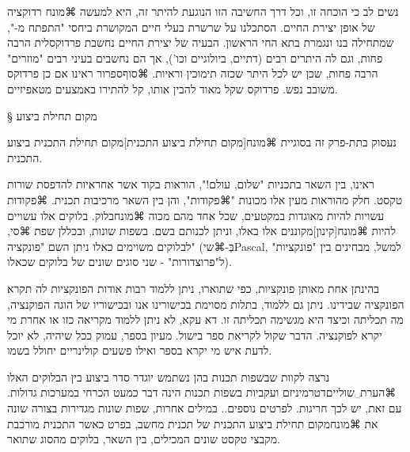 נשים לב כי הוכחה זו, וכל דרך החשיבה הזו הנוגעת להיתר זה, היא למעשה ⌘מונח {רדוקציה} של אופן יצירת החיים. הסתכלנו על שרשרת בעלי חיים המקושרת ביחסי "התפתח מ-", שמתחילה בנו ונגמרת בתא החי הראשון. הבעיה של יצירת החיים נחשבת פרדוקסלית הרבה פחות, וגם לה היתרים רבים (דתיים, ביולוגיים וכו'), אך הם נחשבים בעיני רבים "מוזרים" הרבה פחות, שכן יש לכל היתר שכזה תימוכין וראיות.
⌘סוף{ספרור}
ראינו אם כן פרדוקס משובב נפש. פרדוקס שקל מאוד להבין אותו, קל להתירו באמצעים מטאפיזיים.

§ מקום תחילת ביצוע

נעסוק בתת-פרק זה בסוגיית ⌘מונח[מקום תחילת ביצוע התכנית]{מקום תחילת התכנית} ביצוע התכנית.

ראינו, בין השאר בתכניות "שלום, עולם!", הוראות בקוד אשר אחראיות להדפסת שורות טקסט. חלק מהוראות מעין אלו מכונות "⌘פקודות", והן בין השאר מרכיבות תכנית. ⌘פקודות עשויות להיות מאוגדות במקטעים, שכל אחד מהם מכוה ⌘מונח{בלוק}. בלוקים אלו עשויים להיות ⌘מונח[קינון]{מקוננים} אלו באלו, וניתן לכנותם בשם. בשפות שונות, ובכללן שפת ⌘סי, לבלוקים משוימים כאלו ניתן השם "פונקציה" (בְּ-⌘שי{Pascal}, למשל, מבחינים בין "פונקציות" ל"פרוצדורות" - שני סוגים שונים של בלוקים שכאלו). 

בהינתן אחת מאותן פונקציות, כפי שתוארו, ניתן ללמוד רבות אודות הפונקציות לה תקרא הפונקציה שבידינו. ניתן גם ללמוד, בתלות מסוימת בכישורינו אנו ובכישוריו של הוגה הפוקנציה, מה תכליתה וכיצד היא מגשימה תכליתה זו. דא עקא, לא ניתן ללמוד מקריאה כזו או אחרת מי יקרא לפוקנציה. הדבר שקול לקריאת ספר בישול. מעיון בספר, עמוק ככל שיהיה, לא יוכל לדעת איש מי יקרא בספר ואילו פשעים קולינריים יחולל בשמו. 

נרצה לקוות שבשפות תכנות בהן נשתמש יוגדר סדר ביצוע בין הבלוקים האלו ⌘הערת␣שוליים{דטרמיניזם ועקביות בשפות תכנות הינה דבר כמעט הכרחי במערכות גדולות. עם זאת, יש לכך חריגות. לפרטים נוספים.}. במילים אחרות, שפות שונות מגדירות בצורה שונה את ⌘מונח{מקום תחילת ביצוע התכנית} של תכנית מחשב, בפרט כאשר התכנית מורכבת מקבצי טקסט שונים המכילים, בין השאר, בלוקים מהסוג שתואר. 

